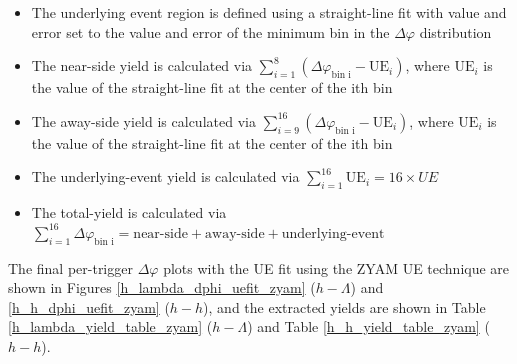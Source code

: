 \documentclass[ALICE,manyauthors]{ALICE_analysis_notes}
\begin{document}
\begin{itemize}
\item The underlying event region is defined using a straight-line fit with value and error set to the value and error of the minimum bin in the $\Delta\varphi$ distribution
\item The near-side yield is calculated via $\sum_{i=1}^{8} (\Delta\varphi_\text{bin i} - \text{UE}_i)$, where $\text{UE}_i$ is the value of the straight-line fit at the center of the ith bin
\item The away-side yield is calculated via $\sum_{i=9}^{16} (\Delta\varphi_\text{bin i} - \text{UE}_i)$, where $\text{UE}_i$ is the value of the straight-line fit at the center of the ith bin
\item The underlying-event yield is calculated via $\sum_{i=1}^{16} \text{UE}_i = 16 \times UE$
\item The total-yield is calculated via $\sum_{i=1}^{16} \Delta\varphi_\text{bin i} = \text{near-side} + \text{away-side} + \text{underlying-event}$
\end{itemize}

The final per-trigger $\Delta\varphi$ plots with the UE fit using the ZYAM UE technique are shown in Figures \ref{h_lambda_dphi_uefit_zyam} ($h-\Lambda$) and \ref{h_h_dphi_uefit_zyam} ($h-h$), and the extracted yields are shown in Table \ref{h_lambda_yield_table_zyam} ($h-\Lambda$) and Table \ref{h_h_yield_table_zyam} ($h-h$).
\end{document}

